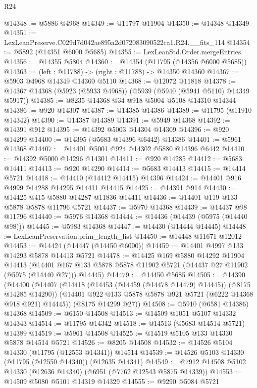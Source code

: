 \begin{lexlean}{R24}
\begin{coremodule}
@14348 := @5886 @4968
@14349 := @11797 @11904
@14350 := @14348 @14349
@14351 := LexLeanPreserve.C029d7d042ae895a2d072083090522ca1.R24.__fits_114
@14354 := @5892 (@14351 @6000 @5685)
@14355 := LexLeanStd.Order.mergeEntries
@14356 := @14355 @5804
@14360 := @14354 (@11795 (@14356 @6000 @5685))
@14363 := (left : @11788) -> (right : @11788) -> @14350 @14360
@14367 := @5903 @4968 @14349 @14360 @5110
@14368 := @12072 @11818
@14378 := @14367 @14368 (@5923 (@5933 @4968)) (@5939 (@5940 (@5941 @5110) @14349 @5917))
@14385 := @8235 @14368 @34 @918 @5004 @5108 @14310 @14344
@14386 := @920 @14307
@14387 := @14385 @14386
@14389 := @11795 (@11910 @14342)
@14390 := @14387 @14389
@14391 := @5949 @14368
@14392 := @14391 @912
@14395 := @14392 @5003 @14304 @14309
@14396 := @920 @14299
@14400 := @14395 (@5683 @14396 @6442) @14386
@14401 := @5961 @14368
@14407 := @14401 @5001 @924 @14302 @5880 @14396 @6442
@14410 := @14392 @5000 @14296 @14301
@14411 := @920 @14285
@14412 := @5683 @14411
@14413 := @920 @14290
@14414 := @5683 @14413
@14415 := @14414 @5721
@14418 := @14410 (@14412 @14415) @14396
@14424 := @14401 @916 @4999 @14288 @14295 @14411 @14415
@14425 := @14391 @914
@14430 := @14425 @415 @5880 @14287 @11836 @14411
@14436 := @14401 @119 @133 @5878 @5878 @11796 @5721
@14437 := @5970 @14368
@14439 := @14437 @98 @11796
@14440 := @5976 @14368
@14444 := @14436 (@14439 (@5975 (@14440 @98)))
@14445 := @5983 @14368
@14447 := @14430 (@14444 @14445)
@14448 := LexLeanPreservation.prim_length_list
@14450 := @14448 @11671 @12012
@14453 := @14424 (@14447 (@14450 @6000))
@14459 := @14401 @4997 @133 @14293 @5878 @14413 @5721
@14478 := @14425
    @169
    @5880
    @14292
    @11904
    @14413
    (@14401 @167 @133 @5878 @5878 @11902 @5721 (@14437 @27 @11902 (@5975 (@14440 @27))) @14445)
@14479 := @14450 @5685
@14505 := @14390
    (@14400
      (@14407
        (@14418 (@14453 (@14459 (@14478 @14479) @14445)) (@8175 @14285 @14290))
        (@14401 @922 @133 @5878 @5878 @921 @5721 (@6222 @14368 @918 @921) @14445))
      (@8175 @14299 @27))
@14508 := @5910 (@6581 @14386) @14368
@14509 := @6150 @14508
@14513 := @14509 @1051 @5107 @14332 @14343
@14514 := @11795 @14342
@14518 := @14513 (@5683 @14514 @5721) @14389
@14519 := @5961 @14508
@14525 := @14519 @5105 @133 @14330 @5878 @14514 @5721
@14526 := @8205 @14508
@14532 := @14526 @5104 @14330 (@11795 (@12553 @14341)) @14514
@14539 := @14526 @5103 @14330 (@11795 (@12550 @14340)) (@12635 @14341)
@14549 := @7912 @14508 @5102 @14330 (@12636 @14340) (@6951 (@7762 @12543 @5875 @14339))
@14553 := @14509 @5080 @5101 @14319 @14329
@14555 := @9290 @5084 @5721

\end{coremodule}
\end{lexlean}
